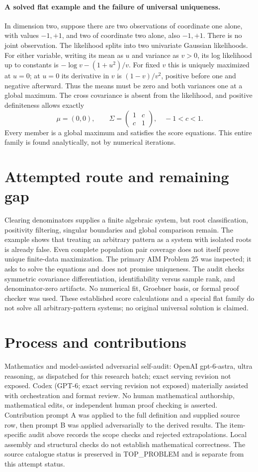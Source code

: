 \documentclass[11pt]{article}
\begin{document}
\paragraph{A solved flat example and the failure of universal uniqueness.}
In dimension two, suppose there are two observations of coordinate one
alone, with values $-1,+1$, and two of coordinate two alone, also
$-1,+1$. There is no joint observation. The likelihood splits into two
univariate Gaussian likelihoods. For either variable, writing its mean
as $u$ and variance as $v>0$, its log likelihood up to constants is
$-\log v-(1+u^2)/v$. For fixed $v$ this is uniquely maximized at
$u=0$; at $u=0$ its derivative in $v$ is $(1-v)/v^2$, positive before
one and negative afterward. Thus the means must be zero and both
variances one at a global maximum. The cross covariance is absent from
the likelihood, and positive definiteness allows exactly
\[
\mu=(0,0),\qquad
\Sigma=\begin{pmatrix}1&c\\c&1\end{pmatrix},\quad -1<c<1.
\]
Every member is a global maximum and satisfies the score equations.
This entire family is found analytically, not by numerical iterations.

\section{Attempted route and remaining gap}
Clearing denominators supplies a finite algebraic system, but root
classification, positivity filtering, singular boundaries and global
comparison remain. The example shows that treating an arbitrary pattern
as a system with isolated roots is already false. Even complete
population pair coverage does not itself prove unique finite-data
maximization. The primary AIM Problem 25 was inspected; it asks to
solve the equations and does not promise uniqueness. The audit checks
symmetric covariance differentiation, identifiability versus sample
rank, and denominator-zero artifacts. No numerical fit, Groebner basis,
or formal proof checker was used. These established score calculations
and a special flat family do not solve all arbitrary-pattern systems;
no original universal solution is claimed.

\section{Process and contributions}
Mathematics and model-assisted adversarial self-audit: OpenAI gpt-6-astra, ultra reasoning, as dispatched for this research batch; exact serving revision not exposed. Codex (GPT-6; exact serving revision not exposed) materially assisted with orchestration and format review. No human mathematical authorship, mathematical edits, or independent human proof checking is asserted.
Contribution prompt A was applied to the full definition and supplied source row, then prompt B was applied adversarially to the derived results. The item-specific audit above records the scope checks and rejected extrapolations. Local assembly and structural checks do not establish mathematical correctness. The source catalogue status is preserved in TOP\_PROBLEM and is separate from this attempt status.
\end{document}
